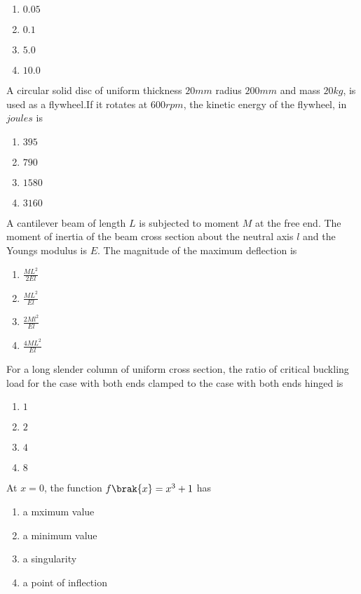     \begin{enumerate}
        \item $0.05$
        \item $0.1$
        \item $5.0$
        \item $10.0$
    \end{enumerate}
    \item A circular solid disc of uniform thickness $20 mm$ radius $200mm$ and mass $20kg$, is used as a flywheel.If it rotates at $600 rpm$, the kinetic energy of the flywheel, in $joules$ is
    \begin{enumerate}
        \item $395$
        \item $790$
        \item $1580$
        \item $3160$
    \end{enumerate}
    \item A cantilever beam of length $L$ is subjected to moment $M$ at the free end. The moment of inertia of the beam cross section about the neutral axis $l$ and the Youngs modulus is $E$. The magnitude of the maximum deflection is
    \begin{enumerate}
        \item $\frac{ML^2}{2El}$
        \item $\frac{ML^2}{El}$
        \item $\frac{2Ml^2}{El}$
        \item $\frac{4ML^2}{El}$
    \end{enumerate}
    \item For a long slender column of uniform cross section, the ratio of critical buckling load for the case with both ends clamped to the case with both ends hinged is
    \begin{enumerate}
        \item $1$
        \item $2$
        \item $4$
        \item $8$
    \end{enumerate}
    \item At $x=0$, the function $f\brak{x}=x^3+1$ has
    \begin{enumerate}
        \item a mximum value
        \item a minimum value 
        \item a singularity
        \item a point of inflection
    \end{enumerate}
